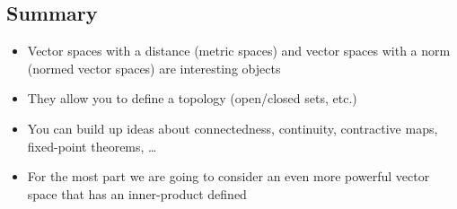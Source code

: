 
\begin{slide}
\section{Summary}

\begin{PauseHighLight}
  \begin{itemize}
  \item Vector spaces with a distance (metric spaces) and vector spaces
    with a norm (normed vector spaces) are interesting objects\pause
  \item They allow you to define a topology (open/closed sets, etc.)\pause
  \item You can build up ideas about connectedness, continuity,
    contractive maps, fixed-point theorems, \ldots\pause
  \item For the most part we are going to consider an even more powerful
    vector space that has an inner-product defined\pause
  \end{itemize}
\end{PauseHighLight}

\end{slide}



